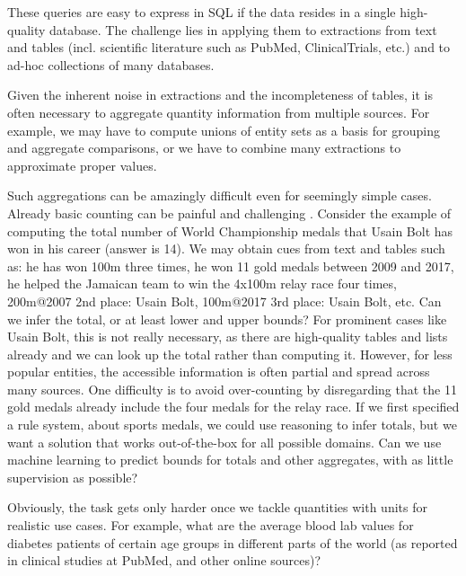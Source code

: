 \documentclass[11pt]{article}
\begin{document}
These queries are easy to express in SQL if the data resides in a single
high-quality database.
The challenge lies in applying them to extractions from text and tables
(incl. scientific literature such as PubMed, ClinicalTrials, etc.)
and to ad-hoc collections of many databases.

\vspace{0.2cm}
%
%
Given the inherent noise in extractions and the
incompleteness of tables, it is often necessary to aggregate 
quantity information from multiple sources.
For example, we may have to compute unions of entity sets
as a basis for grouping and aggregate comparisons,
or we have to combine many extractions
to approximate proper values.

Such aggregations can be amazingly difficult even for seemingly simple cases.
Already basic counting can be painful and challenging \cite{Mirza:ISWC2018}. 
Consider the example
of computing the total number of 
World Championship
medals that Usain Bolt has won in his career (answer is 14).
We may obtain cues from text and tables such as: 
he has won 100m three times,
he won 11 gold medals between 2009 and 2017,
he helped the Jamaican team to win the 4x100m relay race four times,
200m@2007 2nd place: Usain Bolt,
100m@2017 3rd place: Usain Bolt, etc.
Can we infer the total, or at least lower and upper bounds?
For prominent cases like Usain Bolt, this is not really necessary, as there
are high-quality tables and lists already 
and we can look up the total rather than computing it.
However, for less popular entities, the accessible information is often partial
and spread across many sources.
One difficulty is to avoid over-counting by disregarding that the 11 gold medals
already include the four medals for the relay race.
If we first specified a rule system, about sports medals, we could use
reasoning to infer totals, but we want a solution that works out-of-the-box for
all possible domains. 
Can we use machine learning to predict bounds for totals and other aggregates,
with as little supervision as possible?

Obviously, the task gets only harder once we tackle quantities with units
for realistic use cases. For example, what are the average 
blood lab values
for diabetes patients of 
certain age groups in different parts of the world
(as reported in clinical studies at PubMed, and other online sources)?
\end{document}
